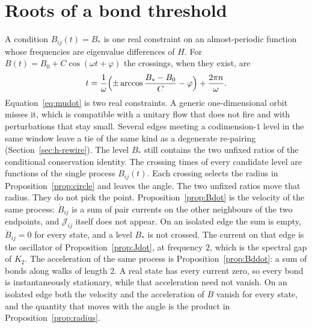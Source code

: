 \section{Roots of a bond threshold}
\label{sec:h-timing}

A condition \(B_{ij}(t)=B_*\) is one real constraint on an almost-periodic
function whose frequencies are eigenvalue differences of \(H\).
For \(B(t)=B_0+C\cos(\omega t+\varphi)\) the crossings, when they exist, are
\[
t=\frac1\omega\Bigl(\pm\arccos\frac{B_*-B_0}{C}-\varphi\Bigr)+\frac{2\pi n}{\omega}.
\]
Equation~\eqref{eq:mudot} is two real constraints.
A generic one-dimensional orbit misses it, which is compatible with a
unitary flow that does not fire and with perturbations that stay small.
Several edges meeting a codimension-\(1\) level in the same window leave a
tie of the same kind as a degenerate re-pairing
(Section~\ref{sec:h-rewire}).
The level \(B_*\) still contains the two unfixed ratios of the conditional
conservation identity.
The crossing times of every candidate level are functions of the single
process \(B_{ij}(t)\).
Each crossing selects the radius in Proposition~\ref{prop:circle} and
leaves the angle.
The two unfixed ratios move that radius.
They do not pick the point.
Proposition~\ref{prop:Bdot} is the velocity of the same process:
\(\dot B_{ij}\) is a sum of pair currents on the other neighbours of the
two endpoints, and \(\mathcal{J}_{ij}\) itself does not appear.
On an isolated edge the sum is empty, \(\dot B_{ij}=0\) for every state,
and a level \(B_*\) is not crossed.
The current on that edge is the oscillator of Proposition~\ref{prop:Jdot},
at frequency \(2\), which is the spectral gap of \(K_2\).
The acceleration of the same process is Proposition~\ref{prop:Bddot}:
a sum of bonds along walks of length \(2\).
A real state has every current zero, so every bond is instantaneously
stationary, while that acceleration need not vanish.
On an isolated edge both the velocity and the acceleration of \(B\) vanish
for every state, and the quantity that moves with the angle is the product
in Proposition~\ref{prop:radius}.
